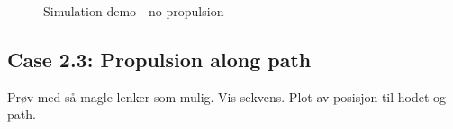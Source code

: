 \begin{figure}
    \hfil
    
    \caption{Simulation demo - no propulsion}
    \label{fig:case2-2}
\end{figure}


\subsection{Case 2.3: Propulsion along path}
Prøv med så magle lenker som mulig.
Vis sekvens. Plot av posisjon til hodet og path.

